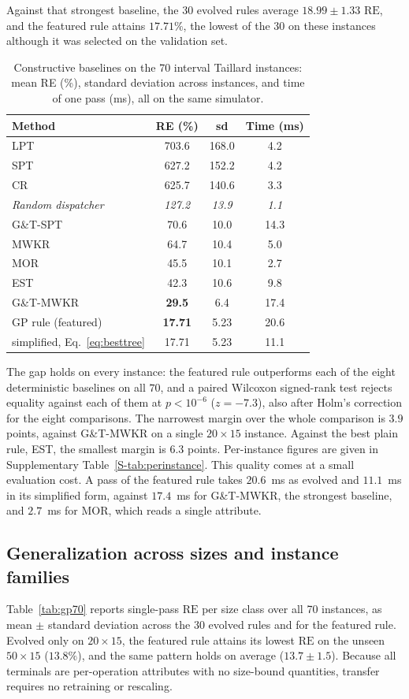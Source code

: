 \documentclass[preprint,number,sort&compress,12pt]{elsarticle}
\newcommand{\RE}{\mathrm{RE}}
\begin{document}
Against that strongest baseline, the 30 evolved rules average
$18.99 \pm 1.33$ $\RE$, and the featured rule attains $17.71\%$, the
lowest of the 30 on these instances although it was selected on the
validation set.

\begin{table}[t]
\centering\small
\caption{Constructive baselines on the 70 interval Taillard instances: mean RE
(\%), standard deviation across instances, and time of one pass (ms), all
on the same simulator.}
\label{tab:baselines}
\begin{tabular}{lccc}
\toprule
Method & RE (\%) & sd & Time (ms) \\
\midrule
LPT & 703.6 & 168.0 & 4.2 \\
SPT & 627.2 & 152.2 & 4.2 \\
CR & 625.7 & 140.6 & 3.3 \\
\midrule
\textit{Random dispatcher} & \textit{127.2} & \textit{13.9} & \textit{1.1} \\
\midrule
G\&T-SPT & 70.6 & 10.0 & 14.3 \\
MWKR & 64.7 & 10.4 & 5.0 \\
MOR & 45.5 & 10.1 & 2.7 \\
EST & 42.3 & 10.6 & 9.8 \\
G\&T-MWKR & \textbf{29.5} & 6.4 & 17.4 \\
\midrule
GP rule (featured) & \textbf{17.71} & 5.23 & 20.6 \\
\quad simplified, Eq.~\eqref{eq:besttree} & 17.71 & 5.23 & 11.1 \\
\bottomrule
\end{tabular}
\end{table}
The gap holds on every instance: the featured rule outperforms each of
the eight deterministic baselines on all $70$, and a paired Wilcoxon
signed-rank test rejects equality against each of them at $p<10^{-6}$
($z=-7.3$), also after Holm's correction for the eight comparisons. The
narrowest margin over the whole comparison is $3.9$ points, against
G\&T-MWKR on a single $20{\times}15$ instance. Against the best plain
rule, EST, the smallest margin is $6.3$ points. Per-instance figures are given in
Supplementary Table~\ref{S-tab:perinstance}. This quality comes at
a small evaluation cost. A pass of the featured rule takes
$20.6$~ms as evolved and $11.1$~ms in its simplified form,
against $17.4$~ms for G\&T-MWKR, the strongest baseline, and
$2.7$~ms for MOR, which reads a single attribute.

\subsection{Generalization across sizes and instance families}
\label{sec:generalization}
\label{sec:classics}
Table~\ref{tab:gp70} reports single-pass $\RE$ per size class over all
70 instances, as mean $\pm$ standard deviation across the 30 evolved
rules and for the featured rule. Evolved only on $20{\times}15$,
the featured rule attains its lowest $\RE$ on the
unseen $50{\times}15$ ($13.8\%$), and the same pattern holds on
average ($13.7 \pm 1.5$). Because all terminals are per-operation
attributes with no size-bound quantities, transfer requires no
retraining or rescaling.
\end{document}
